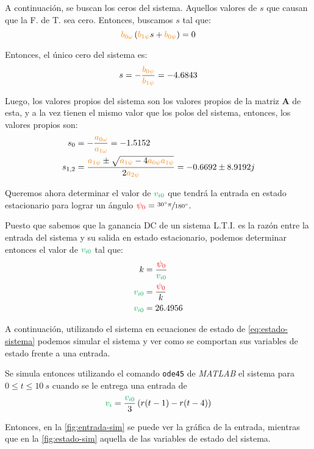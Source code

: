 A continuación, se buscan los ceros del sistema. Aquellos valores de $s$
que causan que la F. de T. sea cero. Entonces, buscamos $s$ tal que:
\begin{equation}
  \nara{\nara{b_{0\omega}}}\left(\nara{b_{1\psi}}s + \nara{b_{0\psi}}\right) = 0
\end{equation}

Entonces, el único cero del sistema es:
\begin{equation}
  s = -\frac{\nara{b_{0\psi}}}{\nara{b_{1\psi}}} = -4.6843
\end{equation}

Luego, los valores propios del sistema son los valores propios de la matriz
$\pmb{A}$ de esta, y a la vez tienen el mismo valor que los polos del
sistema, entonces, los valores propios son:
\begin{align}
  s_{0} &= -\frac{\nara{a_{0\omega}}}{\nara{a_{1\omega}}} = -1.5152 \\
  s_{1,2} &= \frac{\nara{a_{1\psi}} \pm \sqrt{\nara{a_{1\psi}} - 4 \nara{a_{0\psi}a_{1\psi}}}}{2\nara{a_{2\psi}}} = -0.6692 \pm 8.9192j
\end{align}

Queremos ahora determinar el valor de $\verd{v_{i0}}$ que tendrá la
entrada en estado estacionario para lograr un ángulo $\mathbin{\color{red}\psi_{0}} = \sfrac{\ang{30}\pi}{\ang{180}}$.

Puesto que sabemos que la ganancia DC de un sistema L.T.I. es la razón entre la
entrada del sistema y su salida en estado estacionario, podemos determinar
entonces el valor de $\verd{v_{i0}}$ tal que:
\begin{align}
  k &= \frac{\rojo{\psi_{0}}}{\verd{v_{i0}}} \\
  \verd{v_{i0}} &= \frac{\rojo{\psi_{0}}}{k} \\
  \verd{v_{i0}} &= 26.4956
\end{align}

A continuación, utilizando el sistema en ecuaciones de estado de \eqref{eq:estado-sistema}
podemos simular el sistema y ver como se comportan sus variables de estado frente
a una entrada.

Se simula entonces utilizando el comando \texttt{ode45} de \textit{MATLAB} el
sistema para $0 \leq t \leq 10\ \unit{s}$ cuando se le entrega una entrada de
\begin{equation}
  \verd{v_{i}} = \frac{\verd{v_{i0}}}{3}\left(r(t-1) - r(t-4)\right)
\end{equation}

Entonces, en la \autoref{fig:entrada-sim} se puede ver la gráfica de la entrada,
mientras que en la \autoref{fig:estado-sim} aquella de las variables de estado
del sistema.

